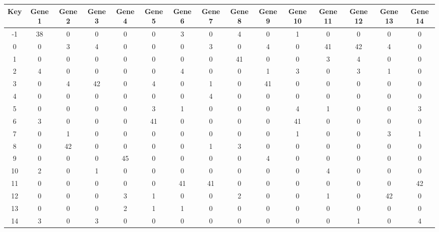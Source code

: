 \begin{tabular}{|c|c|c|c|c|c|c|c|c|c|c|c|c|c|c|}
\hline
Key & Gene 1 & Gene 2 & Gene 3 & Gene 4 & Gene 5 & Gene 6 & Gene 7 & Gene 8 & Gene 9 & Gene 10 & Gene 11 & Gene 12 & Gene 13 & Gene 14 \\
\hline
-1 & 38 & 0 & 0 & 0 & 0 & 3 & 0 & 4 & 0 & 1 & 0 & 0 & 0 & 0 \\
0 & 0 & 3 & 4 & 0 & 0 & 0 & 3 & 0 & 4 & 0 & 41 & 42 & 4 & 0 \\
1 & 0 & 0 & 0 & 0 & 0 & 0 & 0 & 41 & 0 & 0 & 3 & 4 & 0 & 0 \\
2 & 4 & 0 & 0 & 0 & 0 & 4 & 0 & 0 & 1 & 3 & 0 & 3 & 1 & 0 \\
3 & 0 & 4 & 42 & 0 & 4 & 0 & 1 & 0 & 41 & 0 & 0 & 0 & 0 & 0 \\
4 & 0 & 0 & 0 & 0 & 0 & 0 & 4 & 0 & 0 & 0 & 0 & 0 & 0 & 0 \\
5 & 0 & 0 & 0 & 0 & 3 & 1 & 0 & 0 & 0 & 4 & 1 & 0 & 0 & 3 \\
6 & 3 & 0 & 0 & 0 & 41 & 0 & 0 & 0 & 0 & 41 & 0 & 0 & 0 & 0 \\
7 & 0 & 1 & 0 & 0 & 0 & 0 & 0 & 0 & 0 & 1 & 0 & 0 & 3 & 1 \\
8 & 0 & 42 & 0 & 0 & 0 & 0 & 1 & 3 & 0 & 0 & 0 & 0 & 0 & 0 \\
9 & 0 & 0 & 0 & 45 & 0 & 0 & 0 & 0 & 4 & 0 & 0 & 0 & 0 & 0 \\
10 & 2 & 0 & 1 & 0 & 0 & 0 & 0 & 0 & 0 & 0 & 4 & 0 & 0 & 0 \\
11 & 0 & 0 & 0 & 0 & 0 & 41 & 41 & 0 & 0 & 0 & 0 & 0 & 0 & 42 \\
12 & 0 & 0 & 0 & 3 & 1 & 0 & 0 & 2 & 0 & 0 & 1 & 0 & 42 & 0 \\
13 & 0 & 0 & 0 & 2 & 1 & 1 & 0 & 0 & 0 & 0 & 0 & 0 & 0 & 0 \\
14 & 3 & 0 & 3 & 0 & 0 & 0 & 0 & 0 & 0 & 0 & 0 & 1 & 0 & 4 \\
\hline
\end{tabular}